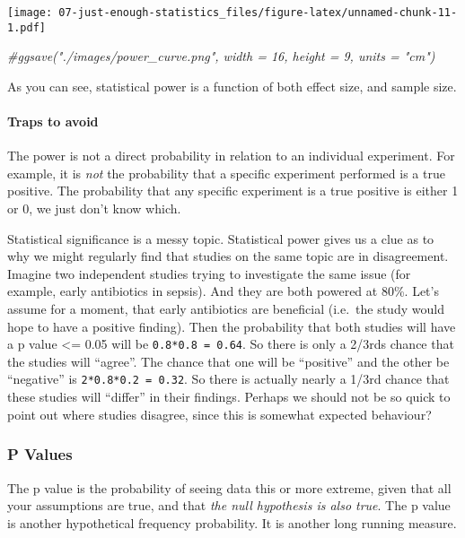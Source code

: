 \documentclass[
]{article}
\newenvironment{Shaded}{\begin{snugshade}}{\end{snugshade}}
\newcommand{\CommentTok}[1]{\textcolor[rgb]{0.56,0.35,0.01}{\textit{#1}}}
\begin{document}
\texttt{[image: 07-just-enough-statistics\_files/figure-latex/unnamed-chunk-11-1.pdf]}

\begin{Shaded}
\begin{Highlighting}[]
\CommentTok{\#ggsave("./images/power\_curve.png", width = 16, height = 9, units = "cm")}
\end{Highlighting}
\end{Shaded}

As you can see, statistical power is a function of both effect size, and
sample size.

\hypertarget{traps-to-avoid}{%
\paragraph{Traps to avoid}\label{traps-to-avoid}}

The power is not a direct probability in relation to an individual
experiment. For example, it is \emph{not} the probability that a
specific experiment performed is a true positive. The probability that
any specific experiment is a true positive is either 1 or 0, we just
don't know which.

Statistical significance is a messy topic. Statistical power gives us a
clue as to why we might regularly find that studies on the same topic
are in disagreement. Imagine two independent studies trying to
investigate the same issue (for example, early antibiotics in sepsis).
And they are both powered at 80\%. Let's assume for a moment, that early
antibiotics are beneficial (i.e.~the study would hope to have a positive
finding). Then the probability that both studies will have a p value
\textless= 0.05 will be \texttt{0.8*0.8\ =\ 0.64}. So there is only a
2/3rds chance that the studies will ``agree''. The chance that one will
be ``positive'' and the other be ``negative'' is
\texttt{2*0.8*0.2\ =\ 0.32}. So there is actually nearly a 1/3rd chance
that these studies will ``differ'' in their findings. Perhaps we should
not be so quick to point out where studies disagree, since this is
somewhat expected behaviour?

\hypertarget{p-values}{%
\subsubsection{P Values}\label{p-values}}

The p value is the probability of seeing data this or more extreme,
given that all your assumptions are true, and that \emph{the null
hypothesis is also true}. The p value is another hypothetical frequency
probability. It is another long running measure.
\end{document}
